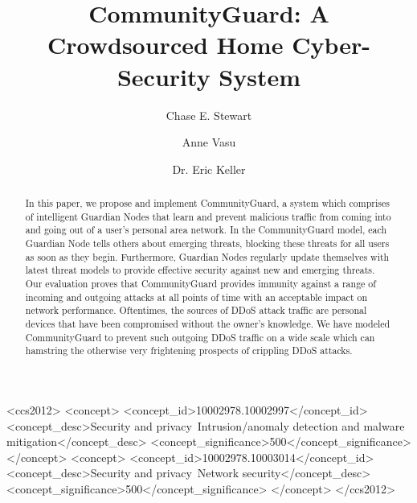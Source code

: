 \documentclass[sigconf]{acmart}
\begin{document}
\title{CommunityGuard: A Crowdsourced Home Cyber-Security System}

\author{Chase E. Stewart}

\author{Anne Vasu}

\author{Dr. Eric Keller}

\setlength{\pdfpagewidth}{8.5in}
\setlength{\pdfpageheight}{11in}

\thispagestyle{empty}

\begin{abstract}
In this paper, we propose and implement CommunityGuard, a system which comprises of intelligent Guardian Nodes that learn and prevent malicious traffic from coming into and going out of a user's personal area network. In the CommunityGuard model, each Guardian Node tells others about emerging threats, blocking these threats for all users as soon as they begin. Furthermore, Guardian Nodes regularly update themselves with latest threat models to provide effective security against new and emerging threats. Our evaluation proves that CommunityGuard provides immunity against a range of incoming and outgoing attacks at all points of time with an acceptable impact on network performance. Oftentimes, the sources of DDoS attack traffic are personal devices that have been compromised without the owner's knowledge. We have modeled CommunityGuard to prevent such outgoing DDoS traffic on a wide scale which can hamstring the otherwise very frightening prospects of crippling DDoS attacks.
\end{abstract}

\begin{CCSXML}
<ccs2012>
	<concept>
		<concept_id>10002978.10002997</concept_id>
		<concept_desc>Security and privacy~Intrusion/anomaly detection and malware mitigation</concept_desc>
		<concept_significance>500</concept_significance>
	</concept>
	<concept>
		<concept_id>10002978.10003014</concept_id>
		<concept_desc>Security and privacy~Network security</concept_desc>
		<concept_significance>500</concept_significance>
	</concept>
</ccs2012>
\end{CCSXML}


\maketitle










\end{document}
